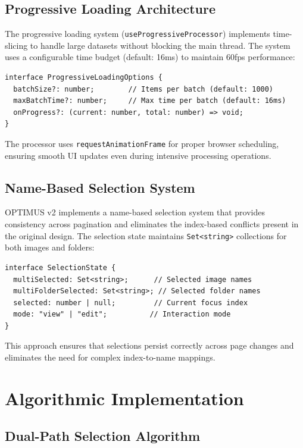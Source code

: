 \documentclass[10pt]{article}
\begin{document}
\subsection{Progressive Loading Architecture}

The progressive loading system (\texttt{useProgressiveProcessor}) implements time-slicing to handle large datasets without blocking the main thread. The system uses a configurable time budget (default: 16ms) to maintain 60fps performance:

\begin{lstlisting}[caption={Progressive Processor Configuration}]
interface ProgressiveLoadingOptions {
  batchSize?: number;        // Items per batch (default: 1000)
  maxBatchTime?: number;     // Max time per batch (default: 16ms)
  onProgress?: (current: number, total: number) => void;
}
\end{lstlisting}

The processor uses \texttt{requestAnimationFrame} for proper browser scheduling, ensuring smooth UI updates even during intensive processing operations.

\subsection{Name-Based Selection System}

OPTIMUS v2 implements a name-based selection system that provides consistency across pagination and eliminates the index-based conflicts present in the original design. The selection state maintains \texttt{Set<string>} collections for both images and folders:

\begin{lstlisting}[caption={Selection State Structure}]
interface SelectionState {
  multiSelected: Set<string>;      // Selected image names
  multiFolderSelected: Set<string>; // Selected folder names
  selected: number | null;         // Current focus index
  mode: "view" | "edit";          // Interaction mode
}
\end{lstlisting}

This approach ensures that selections persist correctly across page changes and eliminates the need for complex index-to-name mappings.

\section{Algorithmic Implementation}

\subsection{Dual-Path Selection Algorithm}
\end{document}
